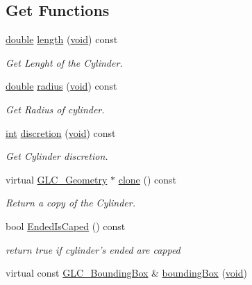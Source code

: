 \subsection*{Get Functions}
\begin{DoxyCompactItemize}
\item 
\hyperlink{_super_l_u_support_8h_a8956b2b9f49bf918deed98379d159ca7}{double} \hyperlink{class_g_l_c___cylinder_a9173bbde07ba8b738864415f13e216b5}{length} (\hyperlink{group___u_a_v_objects_plugin_ga444cf2ff3f0ecbe028adce838d373f5c}{void}) const 
\begin{DoxyCompactList}\small\item\em Get Lenght of the Cylinder. \end{DoxyCompactList}\item 
\hyperlink{_super_l_u_support_8h_a8956b2b9f49bf918deed98379d159ca7}{double} \hyperlink{class_g_l_c___cylinder_a36ffd24cc0550c440603959ac8cb2334}{radius} (\hyperlink{group___u_a_v_objects_plugin_ga444cf2ff3f0ecbe028adce838d373f5c}{void}) const 
\begin{DoxyCompactList}\small\item\em Get Radius of cylinder. \end{DoxyCompactList}\item 
\hyperlink{ioapi_8h_a787fa3cf048117ba7123753c1e74fcd6}{int} \hyperlink{class_g_l_c___cylinder_a9f1c11198a13b44347bfa61aa6a89fa9}{discretion} (\hyperlink{group___u_a_v_objects_plugin_ga444cf2ff3f0ecbe028adce838d373f5c}{void}) const 
\begin{DoxyCompactList}\small\item\em Get Cylinder discretion. \end{DoxyCompactList}\item 
virtual \hyperlink{class_g_l_c___geometry}{G\-L\-C\-\_\-\-Geometry} $\ast$ \hyperlink{class_g_l_c___cylinder_ad88fa465d4559f24c90ec15687bb7548}{clone} () const 
\begin{DoxyCompactList}\small\item\em Return a copy of the Cylinder. \end{DoxyCompactList}\item 
bool \hyperlink{class_g_l_c___cylinder_aa1a7d882290e759b8b0d640b6f8b7148}{Ended\-Is\-Caped} () const 
\begin{DoxyCompactList}\small\item\em return true if cylinder's ended are capped \end{DoxyCompactList}\item 
virtual const \hyperlink{class_g_l_c___bounding_box}{G\-L\-C\-\_\-\-Bounding\-Box} \& \hyperlink{class_g_l_c___cylinder_a4f77655f65f68feed0cb55fad0a3c3f2}{bounding\-Box} (\hyperlink{group___u_a_v_objects_plugin_ga444cf2ff3f0ecbe028adce838d373f5c}{void})

\end{DoxyCompactItemize}
